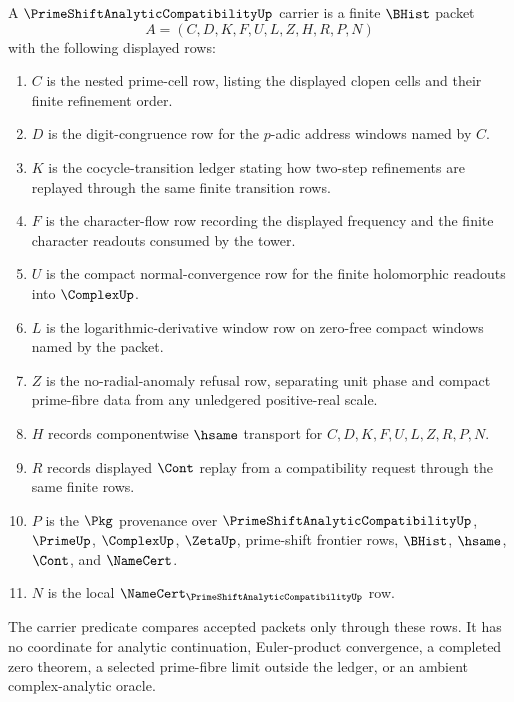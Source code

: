 \begin{definition}
\label{def:prime-shift-analytic-compatibility-carrier}
A $\PrimeShiftAnalyticCompatibilityUp$ carrier is a finite $\BHist$ packet
$$
A=(C,D,K,F,U,L,Z,H,R,P,N)
$$
with the following displayed rows:
\begin{enumerate}
\item $C$ is the nested prime-cell row, listing the displayed clopen cells and their finite refinement order.
\item $D$ is the digit-congruence row for the $p$-adic address windows named by $C$.
\item $K$ is the cocycle-transition ledger stating how two-step refinements are replayed through the same finite transition rows.
\item $F$ is the character-flow row recording the displayed frequency and the finite character readouts consumed by the tower.
\item $U$ is the compact normal-convergence row for the finite holomorphic readouts into $\ComplexUp$.
\item $L$ is the logarithmic-derivative window row on zero-free compact windows named by the packet.
\item $Z$ is the no-radial-anomaly refusal row, separating unit phase and compact prime-fibre data from any unledgered positive-real scale.
\item $H$ records componentwise $\hsame$ transport for $C,D,K,F,U,L,Z,R,P,N$.
\item $R$ records displayed $\Cont$ replay from a compatibility request through the same finite rows.
\item $P$ is the $\Pkg$ provenance over $\PrimeShiftAnalyticCompatibilityUp$, $\PrimeUp$, $\ComplexUp$, $\ZetaUp$, prime-shift frontier rows, $\BHist$, $\hsame$, $\Cont$, and $\NameCert$.
\item $N$ is the local $\NameCert_{\PrimeShiftAnalyticCompatibilityUp}$ row.
\end{enumerate}
The carrier predicate compares accepted packets only through these rows. It has no coordinate for analytic continuation, Euler-product convergence, a completed zero theorem, a selected prime-fibre limit outside the ledger, or an ambient complex-analytic oracle.
\end{definition}

